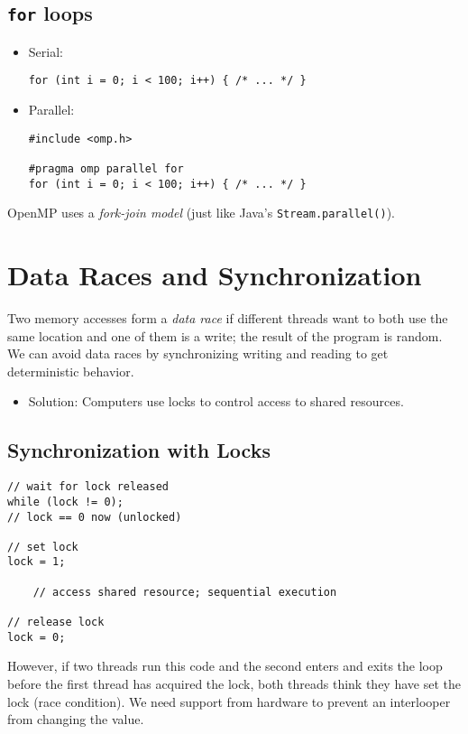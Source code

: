 \subsection{\texttt{for} loops}
\begin{itemize}
	\item Serial:
\begin{verbatim}
for (int i = 0; i < 100; i++) { /* ... */ }
\end{verbatim}

	\item Parallel:
\begin{verbatim}
#include <omp.h>

#pragma omp parallel for
for (int i = 0; i < 100; i++) { /* ... */ }
\end{verbatim}
\end{itemize}

OpenMP uses a \emph{fork-join model} (just like Java's \texttt{Stream.parallel()}).

\section{Data Races and Synchronization}
Two memory accesses form a \emph{data race} if different threads want to both use the same location and one of them is a write; the result of the program is random. We can avoid data races by synchronizing writing and reading to get deterministic behavior.
\begin{itemize}
    \item Solution: Computers use locks to control access to shared resources.
\end{itemize}

\subsection{Synchronization with Locks}
\begin{verbatim}
// wait for lock released
while (lock != 0);
// lock == 0 now (unlocked)

// set lock
lock = 1;

    // access shared resource; sequential execution
    
// release lock
lock = 0;
\end{verbatim}

However, if two threads run this code and the second enters and exits the loop before the first thread has acquired the lock, both threads think they have set the lock (race condition). We need support from hardware to prevent an interlooper from changing the value.

